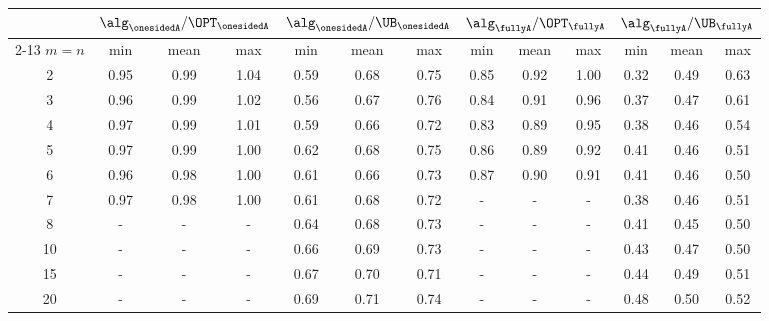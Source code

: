 \begin{tabular}{cccc|ccc|ccc|ccc}
        \toprule
        \multicolumn{1}{c}{} & \multicolumn{3}{c}{$\alg_{\onesidedA}/\OPT_{\onesidedA}$} & \multicolumn{3}{c}{$\alg_{\onesidedA}/\UB_{\onesidedA}$} & \multicolumn{3}{c}{$\alg_{\fullyA}/\OPT_{\fullyA}$} & \multicolumn{3}{c}{$\alg_{\fullyA}/\UB_{\fullyA}$} \\ \cmidrule{2-13}
        $m=n$ & min & mean & max & min & mean & max & min & mean & max & min & mean & max \\
        \midrule
        2 & 0.95 & 0.99 & 1.04 & 0.59 & 0.68 & 0.75 & 0.85 & 0.92 & 1.00 & 0.32 & 0.49 & 0.63 \\
        3 & 0.96 & 0.99 & 1.02 & 0.56 & 0.67 & 0.76 & 0.84 & 0.91 & 0.96 & 0.37 & 0.47 & 0.61 \\
        4 & 0.97 & 0.99 & 1.01 & 0.59 & 0.66 & 0.72 & 0.83 & 0.89 & 0.95 & 0.38 & 0.46 & 0.54 \\
        5 & 0.97 & 0.99 & 1.00 & 0.62 & 0.68 & 0.75 & 0.86 & 0.89 & 0.92 & 0.41 & 0.46 & 0.51 \\
        6 & 0.96 & 0.98 & 1.00 & 0.61 & 0.66 & 0.73 & 0.87 & 0.90 & 0.91 & 0.41 & 0.46 & 0.50 \\
        7 & 0.97 & 0.98 & 1.00 & 0.61 & 0.68 & 0.72 & - & - & - & 0.38 & 0.46 & 0.51 \\
        8 & - & - & - & 0.64 & 0.68 & 0.73 & - & - & - & 0.41 & 0.45 & 0.50 \\
        10 & - & - & - & 0.66 & 0.69 & 0.73 & - & - & - & 0.43 & 0.47 & 0.50 \\
        15 & - & - & - & 0.67 & 0.70 & 0.71 & - & - & - & 0.44 & 0.49 & 0.51 \\
        20 & - & - & - & 0.69 & 0.71 & 0.74 & - & - & - & 0.48 & 0.50 & 0.52 \\
        \bottomrule
\end{tabular}

